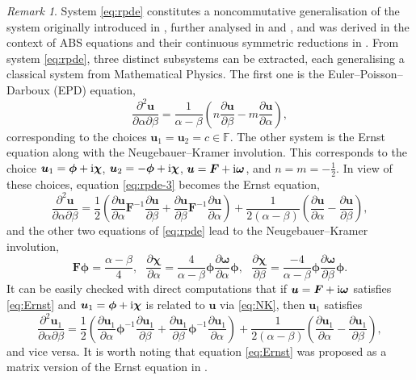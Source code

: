 \documentclass[dvips,10pt]{article}
\newcommand{\bs}{\boldsymbol}
\newcommand{\bsu}{ {\bs{u}}}
\newcommand{\bsF}{ {\bs{F}}}
\theoremstyle{remark} %
\newtheorem{remark}{Remark}
\begin{document}
	
	
	\begin{remark}
		System \eqref{eq:rpde} constitutes a noncommutative generalisation of the system originally introduced in \cite{NHJ}, further analysed in \cite{TTX1} and \cite{TTX}, and was derived in the context of ABS equations and their continuous symmetric reductions in \cite{TX}. From system \eqref{eq:rpde}, three distinct subsystems can be extracted, each generalising a classical system from Mathematical Physics. The first one is the Euler--Poisson--Darboux (EPD) equation,
		$$\frac{\partial^2 {\bs{u}}}{\partial \alpha \partial \beta} = \frac{1}{\alpha-\beta} \left(n \frac{\partial {\bs{u}}}{\partial \beta} -  m \frac{\partial {\bs{u}}}{\partial \alpha} \right),$$
		corresponding to the choices $ \bsu_1 = \bsu_2 = c \in {\mathbb{F}}$. The other system is the Ernst equation along with the Neugebauer--Kramer involution. This corresponds to the choice $ \bsu_1 = {\bs{\phi}} + {\rm{i}} {\bs{\chi}}$, $\bsu_2 = -{\bs{\phi}} + {\rm{i}} {\bs{\chi}}$, $\bsu = \bsF + {\rm{i}} {\bs{\omega}}$, and $n=m=-\tfrac{1}{2}$. In view of these choices, equation \eqref{eq:rpde-3} becomes the Ernst equation,
		\begin{equation} \label{eq:Ernst}
			\frac{\partial^2 {\bs{u}}}{\partial \alpha \partial \beta} =  \frac{1}{2} \left(\frac{\partial {\bs{u}}}{\partial \alpha} \bsF^{-1}  \frac{\partial {\bs{u}}}{\partial \beta} + \frac{\partial {\bs{u}}}{\partial \beta} \bsF^{-1}  \frac{\partial {\bs{u}}}{\partial \alpha}\right) + \frac{1}{2 \left(\alpha-\beta\right)}  \left(\frac{\partial {\bs{u}}}{\partial \alpha} - \frac{\partial {\bs{u}}}{\partial \beta}\right),
		\end{equation}
		and the other two equations of \eqref{eq:rpde} lead to the Neugebauer--Kramer involution,
		\begin{equation} \label{eq:NK}
			\bsF {\bs{\phi}} = \frac{\alpha-\beta}{4}, ~~~ \frac{\partial {\bs{\chi}}}{\partial \alpha} = \frac{4}{\alpha-\beta} {\bs{\phi}} \frac{\partial {\bs{\omega}}}{\partial \alpha}  {\bs{\phi}},~~~ \frac{\partial {\bs{\chi}}}{\partial \beta} = \frac{-4}{\alpha-\beta} {\bs{\phi}} \frac{\partial {\bs{\omega}}}{\partial \beta}  {\bs{\phi}}.
		\end{equation}
		It can be easily checked with direct computations that if $\bsu = \bsF + {\rm{i}} {\bs{\omega}}$ satisfies \eqref{eq:Ernst} and $\bsu_1= {\bs{\phi}} + {\rm{i}} {\bs{\chi}}$ is related to $\bsu$ via \eqref{eq:NK}, then $\bsu_1$ satisfies
		$$\frac{\partial^2 {\bs{u}}_1}{\partial \alpha \partial \beta} =  \frac{1}{2} \left(\frac{\partial {\bs{u}}_1}{\partial \alpha} {\bs{\phi}}^{-1}  \frac{\partial {\bs{u}}_1}{\partial \beta} + \frac{\partial {\bs{u}}_1}{\partial \beta} {\bs{\phi}}^{-1}  \frac{\partial {\bs{u}}_1}{\partial \alpha}\right) + \frac{1}{2 \left(\alpha-\beta\right)}  \left(\frac{\partial {\bs{u}}_1}{\partial \alpha} - \frac{\partial {\bs{u}}_1}{\partial \beta}\right), $$
		and vice versa. It is worth noting that equation \eqref{eq:Ernst} was proposed as a matrix version of the Ernst equation in \cite{AL}.
		

\end{remark}
\end{document}
